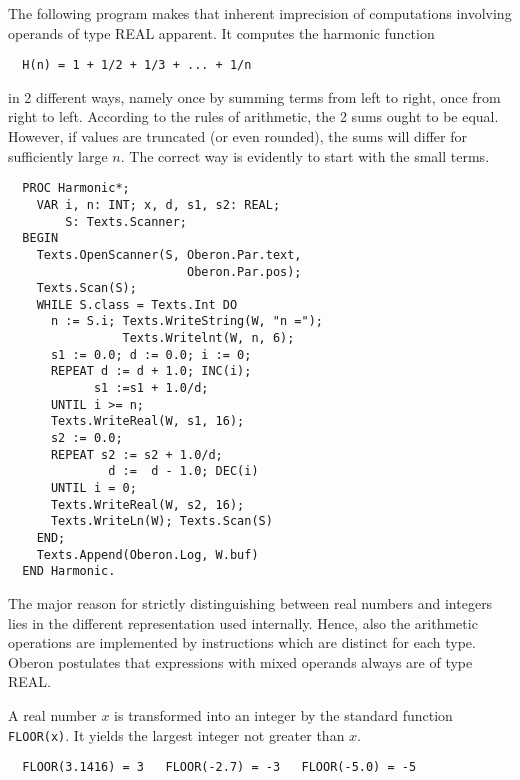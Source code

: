 The following program makes that inherent imprecision of computations involving operands of type
REAL apparent. It computes the harmonic function
\begin{verbatim}
  H(n) = 1 + 1/2 + 1/3 + ... + 1/n
\end{verbatim}
in 2 different ways, namely once by summing terms from left to right, once from right to left.
According to the rules of arithmetic, the 2 sums ought to be equal. However, if values are truncated
(or even rounded), the sums will differ for sufficiently large $n$. The correct way is evidently
to start with the small terms.
\begin{verbatim}
  PROC Harmonic*;
    VAR i, n: INT; x, d, s1, s2: REAL;
        S: Texts.Scanner;
  BEGIN
    Texts.OpenScanner(S, Oberon.Par.text,
                         Oberon.Par.pos);
    Texts.Scan(S);
    WHILE S.class = Texts.Int DO
      n := S.i; Texts.WriteString(W, "n =");
                Texts.Writelnt(W, n, 6);
      s1 := 0.0; d := 0.0; i := 0;
      REPEAT d := d + 1.0; INC(i);
            s1 :=s1 + 1.0/d;
      UNTIL i >= n;
      Texts.WriteReal(W, s1, 16);
      s2 := 0.0;
      REPEAT s2 := s2 + 1.0/d;
              d :=  d - 1.0; DEC(i)
      UNTIL i = 0;
      Texts.WriteReal(W, s2, 16);
      Texts.WriteLn(W); Texts.Scan(S)
    END;
    Texts.Append(Oberon.Log, W.buf)
  END Harmonic.
\end{verbatim}
The major reason for strictly distinguishing between real numbers and integers lies in the different
representation used internally. Hence, also the arithmetic operations are implemented by
instructions which are distinct for each type. Oberon postulates that expressions with mixed
operands always are of type REAL.

A real number $x$ is transformed into an integer by the standard function \verb|FLOOR(x)|. It yields
the largest integer not greater than $x$.
\begin{verbatim}
  FLOOR(3.1416) = 3   FLOOR(-2.7) = -3   FLOOR(-5.0) = -5
\end{verbatim}

